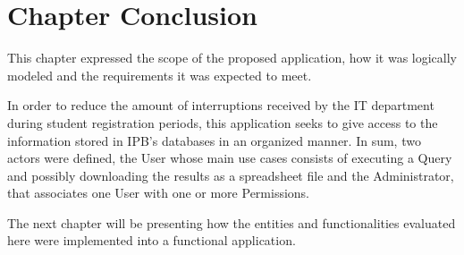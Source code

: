 \section{Chapter Conclusion}

This chapter expressed the scope of the proposed application, how it was logically modeled and the requirements it was expected to meet.

In order to reduce the amount of interruptions received by the \gls{IT} department during student registration periods, this application seeks to give access to the information stored in \gls{IPB}'s databases in an organized manner. In sum, two actors were defined, the User whose main use cases consists of executing a Query and possibly downloading the results as a spreadsheet file and the Administrator, that associates one User with one or more Permissions.

The next chapter will be presenting how the entities and functionalities evaluated here were implemented into a functional application.